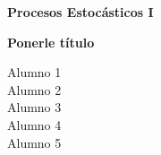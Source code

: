 \documentclass[12pt,a4paper,openany,oneside]{memoir}
\begin{document}

\begin{titlingpage} %

    \raggedleft %
	
	\vspace*{\baselineskip} %
	
	\vspace*{0.25\textheight} %
	
	
    \textbf{\huge Procesos Estocásticos I}\\[\baselineskip] %
    
    \vspace*{0.1\textheight}

    {\Huge{\textbf{Ponerle título}}}\\[\baselineskip] %
    \vspace*{0.1\textheight}

    
    {\Large Alumno 1}\\[\baselineskip]
    {\Large Alumno 2}\\[\baselineskip]
    {\Large Alumno 3}\\[\baselineskip]
    {\Large Alumno 4}\\[\baselineskip]
    {\Large Alumno 5}\\[\baselineskip]
	
	\vfill

\end{titlingpage}

\frontmatter
\tableofcontents
\listoffigures
\listoftables
\listofalgorithms

\mainmatter
\thispagestyle{empty}





\newpage
\appendix



\newpage
\backmatter
\printbibliography[title={Referencias}]
\end{document}
